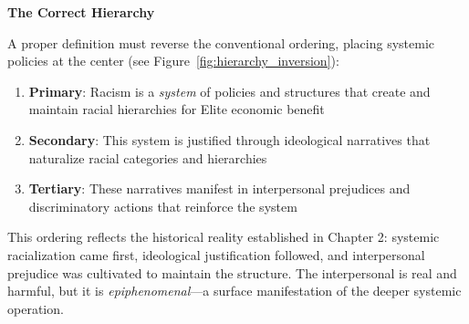\documentclass[12pt,openany]{book}
\begin{document}
\textbf{The Correct Hierarchy}

A proper definition must reverse the conventional ordering, placing systemic policies at the center (see Figure~\ref{fig:hierarchy_inversion}):

\begin{enumerate}
    \item \textbf{Primary}: Racism is a \textit{system} of policies and structures that create and maintain racial hierarchies for Elite economic benefit
    \item \textbf{Secondary}: This system is justified through ideological narratives that naturalize racial categories and hierarchies
    \item \textbf{Tertiary}: These narratives manifest in interpersonal prejudices and discriminatory actions that reinforce the system
\end{enumerate}

This ordering reflects the historical reality established in Chapter 2: systemic racialization came first, ideological justification followed, and interpersonal prejudice was cultivated to maintain the structure. The interpersonal is real and harmful, but it is \textit{epiphenomenal}---a surface manifestation of the deeper systemic operation.
\end{document}
